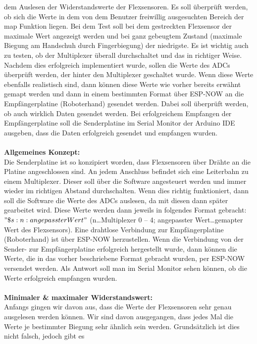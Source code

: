 \documentclass[11pt]{article}
\begin{document}
dem Auslesen der Widerstandswerte der Flexsensoren. Es soll überprüft werden, ob sich die Werte in dem von dem Benutzer 
freiwillig ausgesuchten Bereich der map Funktion liegen. Bei dem Test soll bei dem gestreckten Flexsensor der maximale Wert 
angezeigt werden und bei ganz gebeugtem Zustand (maximale Biegung am Handschuh durch Fingerbiegung) der niedrigste. Es ist 
wichtig auch zu testen, ob der Multiplexer überall durchschaltet und das in richtiger Weise. Nachdem dies erfolgreich 
implementiert wurde, sollen die Werte des ADCs überprüft werden, der hinter den Multiplexer geschaltet wurde. Wenn diese Werte 
ebenfalls realistisch sind, dann können diese Werte wie vorher bereits erwähnt gemapt werden und dann in einem bestimmten Format 
über ESP-NOW an die Empfängerplatine (Roboterhand) gesendet werden. Dabei soll überprüft werden, ob auch wirklich Daten 
gesendet werden. Bei erfolgreichem Empfangen der Empfängerplatine soll die Senderplatine im Serial Monitor der Arduino IDE 
ausgeben, dass die Daten erfolgreich gesendet und empfangen wurden. \\
\\
\textbf{Allgemeines Konzept:}
\\
Die Senderplatine ist so konzipiert worden, dass Flexsensoren über Drähte an die Platine angeschlossen sind. An jedem Anschluss 
befindet sich eine Leiterbahn zu einem Multiplexer. Dieser soll über die Software angesteuert werden und immer wieder im 
richtigen Abstand durchschalten. Wenn dies richtig funktioniert, dann soll die Software die Werte des ADCs auslesen, da mit 
diesen dann später gearbeitet wird. Diese Werte werden dann jeweils in folgendes Format gebracht: $"\$s:n:angepassterWert"$ 
(n…Multiplexer 0 – 4; angepasster Wert…gemapter Wert des Flexsensors). Eine drahtlose Verbindung zur Empfängerplatine 
(Roboterhand) ist über ESP-NOW herzustellen. Wenn die Verbindung von der Sender- zur Empfängerplatine erfolgreich hergestellt 
wurde, dann können die Werte, die in das vorher beschriebene Format gebracht wurden, per ESP-NOW versendet werden. Als Antwort 
soll man im Serial Monitor sehen können, ob die Werte erfolgreich empfangen wurden. \\
\\
\textbf{Minimaler \& maximaler Widerstandswert:}
\\
Anfangs gingen wir davon aus, dass die Werte der Flexsensoren sehr genau ausgelesen werden können. Wir sind davon ausgegangen, 
dass jedes Mal die Werte je bestimmter Biegung sehr ähnlich sein werden. Grundsätzlich ist dies nicht falsch, jedoch gibt es 
\end{document}
